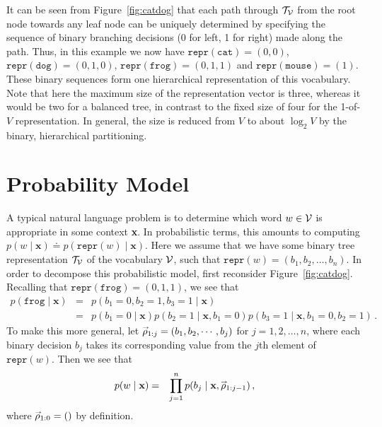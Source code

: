 \documentclass[a4paper]{article}
\newcommand{\rvec}[1]{\accentset{\rightarrow}{#1}}
\begin{document}
It can be seen from Figure~\ref{fig:catdog} that each path through ${\cal T}_{\cal V}$ 
from the root node towards any leaf node
can be uniquely determined by specifying the 
sequence of binary branching decisions (0 for left, 1 for right) made along the path.
Thus, in this example we now have $\texttt{repr}(\texttt{cat})=(0,0)$, 
$\texttt{repr}(\texttt{dog})=(0,1,0)$, $\texttt{repr}(\texttt{frog})=(0,1,1)$
and $\texttt{repr}(\texttt{mouse})=(1)$.
These binary sequences form one hierarchical representation of this vocabulary.
Note that here the maximum size of the representation vector is three, whereas it would be two for a balanced tree,
in contrast to the fixed size of four for the 1-of-$V$ representation.
In general, the size is reduced from $V$ to about $\log_2 V$ by the binary, hierarchical partitioning.

\section{Probability Model}

A typical natural language problem is to determine which word $w\in{\cal V}$ is appropriate in some context
\textbf{x}. In probabilistic terms, this amounts to computing $p(w\;|\;\textbf{x})\doteq p(\texttt{repr}(w)\;|\;\textbf{x})$.
Here we assume that we have some binary tree representation ${\cal T}_{\cal V}$ of the vocabulary ${\cal V}$,
such that $\texttt{repr}(w)=(b_1,b_2,\ldots,b_n)$.
In order to decompose this probabilistic model, first reconsider Figure~\ref{fig:catdog}.
Recalling that $\texttt{repr}(\texttt{frog})=(0,1,1)$, we see that
\begin{eqnarray}
p(\texttt{frog}\;|\;\textbf{x})
& = & p(b_1=0,b_2=1,b_3=1\;|\;\textbf{x})
\nonumber\\
& = & p(b_1=0\;|\;\textbf{x})p(b_2=1\;|\;\textbf{x},b_1=0)
p(b_3=1\;|\;\textbf{x},b_1=0,b_2=1)
\,.\nonumber
\end{eqnarray}
To make this more general, let $\rvec{\rho}_{1:j}=(b_1, b_2, \cdots, b_j)$ for $j=1,2,\ldots,n$,
where each binary decision $b_j$ takes its corresponding value from the $j$th element of $\texttt{repr}(w)$.
Then we see that
\begin{eqnarray}
p(w\;|\;\textbf{x})
& = & \prod_{j=1}^n p(b_j\;|\;\textbf{x},\rvec{\rho}_{1:j-1})\,,
\label{eq:p:word}
\end{eqnarray}
where $\rvec{\rho}_{1:0}=()$ by definition.
\end{document}
